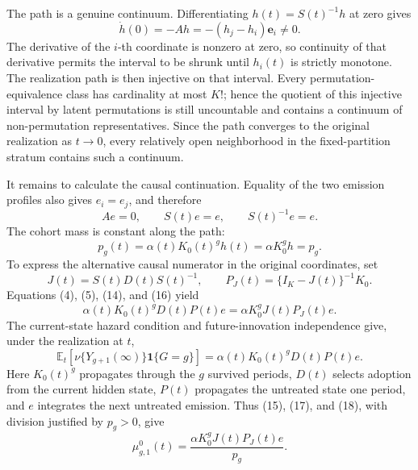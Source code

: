 The path is a genuine continuum. Differentiating \(h(t)=S(t)^{-1}h\) at zero gives
\[
 \dot h(0)=-Ah=-(h_j-h_i)\mathbf e_i\ne0.                    \tag{13}
\]
The derivative of the \(i\)-th coordinate is nonzero at zero, so continuity of that derivative permits the interval to be shrunk until \(h_i(t)\) is strictly monotone. The realization path is then injective on that interval. Every permutation-equivalence class has cardinality at most \(K!\); hence the quotient of this injective interval by latent permutations is still uncountable and contains a continuum of non-permutation representatives. Since the path converges to the original realization as \(t\to0\), every relatively open neighborhood in the fixed-partition stratum contains such a continuum.

It remains to calculate the causal continuation. Equality of the two emission profiles also gives \(e_i=e_j\), and therefore
\[
 Ae=0,\qquad S(t)e=e,\qquad S(t)^{-1}e=e.                    \tag{14}
\]
The cohort mass is constant along the path:
\[
 p_g(t)=\alpha(t)K_0(t)^gh(t)
 =\alpha K_0^gh=p_g.                                          \tag{15}
\]
To express the alternative causal numerator in the original coordinates, set
\[
 J(t)=S(t)D(t)S(t)^{-1},\qquad
 P_J(t)=\{I_K-J(t)\}^{-1}K_0.                                 \tag{16}
\]
Equations (4), (5), (14), and (16) yield
\[
 \alpha(t)K_0(t)^gD(t)P(t)e
 =\alpha K_0^gJ(t)P_J(t)e.                                    \tag{17}
\]
The current-state hazard condition and future-innovation independence give, under the realization at \(t\),
\[
 \mathbb E_t\!\left[\nu\{Y_{g+1}(\infty)\}\mathbf 1\{G=g\}\right]
 =\alpha(t)K_0(t)^gD(t)P(t)e.                                  \tag{18}
\]
Here \(K_0(t)^g\) propagates through the \(g\) survived periods, \(D(t)\) selects adoption from the current hidden state, \(P(t)\) propagates the untreated state one period, and \(e\) integrates the next untreated emission. Thus (15), (17), and (18), with division justified by \(p_g>0\), give
\[
 \mu^0_{g,1}(t)=\frac{\alpha K_0^gJ(t)P_J(t)e}{p_g}.          \tag{19}
\]

